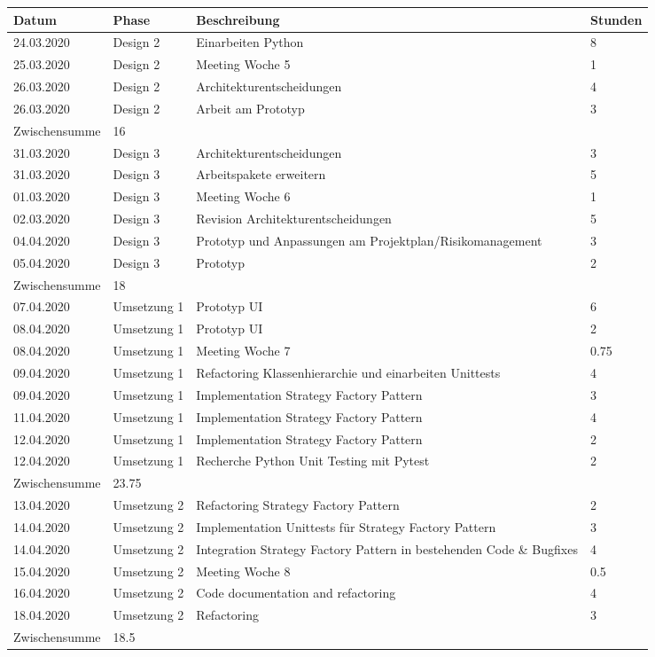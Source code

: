 \documentclass[
	ngerman,
	toc=listof, %
	toc=bibliography, %
	footnotes=multiple, %
	parskip=half, %
	numbers=noendperiod %
]{scrartcl}
\begin{document}
	\newpage

	\begin{tabularx}{\textwidth}{llXl}
		\toprule
		Datum & Phase & Beschreibung & Stunden \\
		\midrule
		24.03.2020 & Design 2 & Einarbeiten Python & 8 \\
		25.03.2020 & Design 2 & Meeting Woche 5 & 1 \\
		26.03.2020 & Design 2 & Architekturentscheidungen & 4 \\
		26.03.2020 & Design 2 & Arbeit am Prototyp & 3 \\
		\midrule
		Zwischensumme & 16 & & \\
		\midrule
		31.03.2020 & Design 3 & Architekturentscheidungen & 3 \\
		31.03.2020 & Design 3 & Arbeitspakete erweitern &  5 \\
		01.03.2020 & Design 3 & Meeting Woche 6 & 1 \\
		02.03.2020 & Design 3 & Revision Architekturentscheidungen & 5 \\
		04.04.2020 & Design 3 & Prototyp und Anpassungen am Projektplan/Risikomanagement & 3 \\ 
		05.04.2020 & Design 3 & Prototyp & 2 \\
		\midrule
		Zwischensumme & 18 & & \\
		\midrule
		07.04.2020 & Umsetzung 1 & Prototyp UI & 6 \\
		08.04.2020 & Umsetzung 1 & Prototyp UI & 2 \\
		08.04.2020 & Umsetzung 1 & Meeting Woche 7 & 0.75 \\
		09.04.2020 & Umsetzung 1 & Refactoring Klassenhierarchie und einarbeiten Unittests & 4 \\
		09.04.2020 & Umsetzung 1 & Implementation Strategy Factory Pattern & 3 \\
		11.04.2020 & Umsetzung 1 & Implementation Strategy Factory Pattern & 4 \\
		12.04.2020 & Umsetzung 1 & Implementation Strategy Factory Pattern & 2 \\
		12.04.2020 & Umsetzung 1 & Recherche Python Unit Testing mit Pytest & 2 \\
		\midrule
		Zwischensumme & 23.75 & & \\
		\midrule
		13.04.2020 & Umsetzung 2 & Refactoring Strategy Factory Pattern & 2 \\
		14.04.2020 & Umsetzung 2 & Implementation Unittests für Strategy Factory Pattern & 3 \\
		14.04.2020 & Umsetzung 2 & Integration Strategy Factory Pattern in bestehenden Code \& Bugfixes & 4 \\
		15.04.2020 & Umsetzung 2 & Meeting Woche 8 & 0.5 \\
		16.04.2020 & Umsetzung 2 & Code documentation and refactoring & 4 \\
		18.04.2020 & Umsetzung 2 & Refactoring & 3 \\
		\midrule
		Zwischensumme & 18.5 & & \\
		\bottomrule
	\end{tabularx}
	
\end{document}
